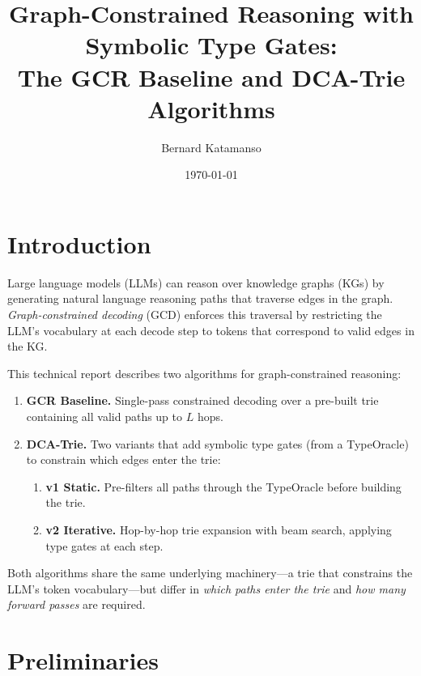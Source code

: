 \documentclass[11pt,a4paper]{article}
\title{Graph-Constrained Reasoning with Symbolic Type Gates:\\
The GCR Baseline and DCA-Trie Algorithms}
\author{Bernard Katamanso}
\date{\today}
\begin{document}
\maketitle

\section{Introduction}

Large language models (LLMs) can reason over knowledge graphs (KGs) by
generating natural language reasoning paths that traverse edges in the
graph.  \emph{Graph-constrained decoding} (GCD) enforces this traversal
by restricting the LLM's vocabulary at each decode step to tokens that
correspond to valid edges in the KG.

This technical report describes two algorithms for graph-constrained
reasoning:

\begin{enumerate}[label=\textbf{A\arabic*},leftmargin=2.5em]
  \item \textbf{GCR Baseline.}  Single-pass constrained decoding over
    a pre-built trie containing all valid paths up to $L$ hops.
  \item \textbf{DCA-Trie.}  Two variants that add symbolic type gates
    (from a TypeOracle) to constrain which edges enter the trie:
    \begin{enumerate}[label=(\alph*)]
      \item \textbf{v1 Static.}  Pre-filters all paths through the
        TypeOracle before building the trie.
      \item \textbf{v2 Iterative.}  Hop-by-hop trie expansion with
        beam search, applying type gates at each step.
    \end{enumerate}
\end{enumerate}

Both algorithms share the same underlying machinery---a trie that
constrains the LLM's token vocabulary---but differ in \emph{which
paths enter the trie} and \emph{how many forward passes} are required.

\section{Preliminaries}
\end{document}
